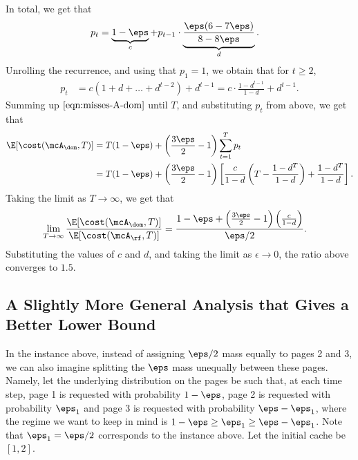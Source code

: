 In total, we get that
\begin{align*}
    p_t &= \underbrace{1-\eps}_{c} + p_{t-1}\cdot \underbrace{\frac{\eps(6-7\eps)}{8-8\eps}}_{d}. 
\end{align*}
Unrolling the recurrence, and using that $p_{1}=1$, we obtain that for $t \ge 2$,
\begin{align*}
    p_t &= c(1+d+\dots+d^{t-2}) + d^{t-1} = c\cdot \frac{1-d^{t-1}}{1-d} + d^{t-1}.
\end{align*}
Summing up $\eqref{eqn:misses-A-dom}$ until $T$, and substituting $p_t$ from above, we get that
\begin{align*}
    \E[\cost(\mcA_\dom, T)] &= T(1-\eps) + \left(\frac{3\eps}{2}-1\right)\sum_{t=1}^{T}p_t \\
    &= T(1-\eps) + \left(\frac{3\eps}{2}-1\right)\left[\frac{c}{1-d}\left(T-\frac{1-d^T}{1-d}\right)+\frac{1-d^T}{1-d}\right].
\end{align*}
Taking the limit as $T \to \infty$, we get that
\begin{align*}
    \lim_{T \to \infty}\frac{\E[\cost(\mcA_\dom, T)]}{\E[\cost(\mcA_\rf, T)]} &= \frac{1-\eps+\left(\frac{3\eps}{2}-1\right)\left(\frac{c}{1-d}\right)}{\eps/2}.
\end{align*}
Substituting the values of $c$ and $d$, and taking the limit as $\epsilon \to 0$, the ratio above converges to $1.5$.

\subsection{A Slightly More General Analysis that Gives a Better Lower Bound}
\label{sec:1.5907-lb}

In the instance above, instead of assigning $\eps/2$ mass equally to pages 2 and 3, we can also imagine splitting the $\eps$ mass unequally between these pages. Namely, let the underlying distribution on the pages be such that, at each time step, page 1 is requested with probability $1-\eps$, page 2 is requested with probability $\eps_1$ and page 3 is requested with probability $\eps-\eps_1$, where the regime we want to keep in mind is $1-\eps \ge \eps_1 \ge \eps-\eps_1$. Note that $\eps_1=\eps/2$ corresponds to the instance above. Let the initial cache be $[1,2]$.

